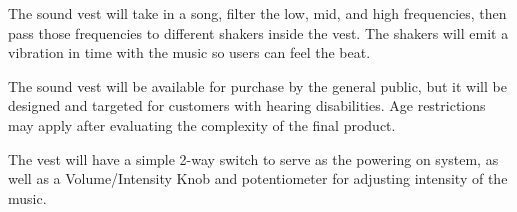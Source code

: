 The sound vest will take in a song, filter the low, mid, and high frequencies, then pass those frequencies to different shakers inside the vest. The shakers will emit a vibration in time with the music so users can feel the beat.

The sound vest will be available for purchase by the general public, but it will be designed and targeted for customers with hearing disabilities. Age restrictions may apply after evaluating the complexity of the final product.

The vest will have a simple 2-way switch to serve as the powering on system, as well as a Volume/Intensity Knob and potentiometer for adjusting intensity of the music.